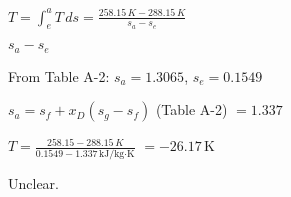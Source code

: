 \( T = \int_{e}^{a} T \, ds = \frac{258.15 \, K - 288.15 \, K}{s_a - s_e} \)  

\( s_a - s_e \)  

From Table A-2:  
\( s_a = 1.3065 \), \( s_e = 0.1549 \)  

\( s_a = s_f + x_D (s_g - s_f) \) (Table A-2)  
\( = 1.337 \)  

\( T = \frac{258.15 - 288.15 \, K}{0.1549 - 1.337 \, \text{kJ/kg·K}} \)  
\( = -26.17 \, \text{K} \)  

Unclear.